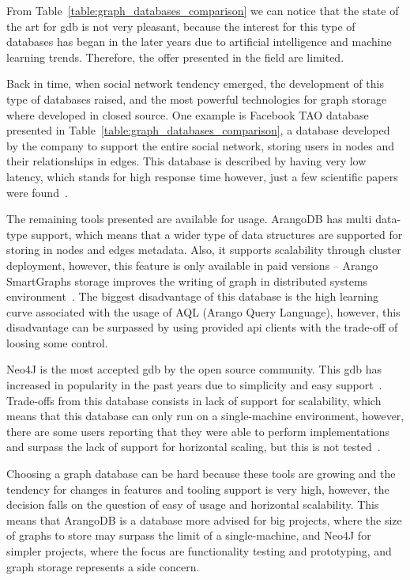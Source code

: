 From Table~\ref{table:graph_databases_comparison} we can notice that the state of the art for \gls{gdb} is not very pleasant, because the interest for this type of databases has began in the later years due to artificial intelligence and machine learning trends. Therefore, the offer presented in the field are limited.

Back in time, when social network tendency emerged, the development of this type of databases raised, and the most powerful technologies for graph storage where developed in closed source. One example is Facebook TAO database presented in Table~\ref{table:graph_databases_comparison}, a database developed by the company to support the entire social network, storing users in nodes and their relationships in edges. This database is described by having very low latency, which stands for high response time however, just a few scientific papers were found~\cite{facebook_tao_article,Amenya2018}.

The remaining tools presented are available for usage. ArangoDB has multi data-type support, which means that a wider type of data structures are supported for storing in nodes and edges metadata. Also, it supports scalability through cluster deployment, however, this feature is only available in paid versions -- Arango SmartGraphs storage improves the writing of graph in distributed systems environment~\cite{arangodb_smart_graphs}. The biggest disadvantage of this database is the high learning curve associated with the usage of AQL (Arango Query Language), however, this disadvantage can be surpassed by using provided \gls{api} clients with the trade-off of loosing some control.

Neo4J is the most accepted \gls{gdb} by the open source community. This \gls{gdb}
has increased in popularity in the past years due to simplicity and easy support~\cite{Turu2017}. Trade-offs from this database consists in lack of support for scalability, which means that this database can only run on a single-machine environment, however, there are some users reporting that they were able to perform implementations and surpass the lack of support for horizontal scaling, but this is not tested~\cite{neo4j_scalable}.

Choosing a graph database can be hard because these tools are growing and the tendency for changes in features and tooling support is very high, however,  the decision falls on the question of easy of usage and horizontal scalability. This means that ArangoDB is a database more advised for big projects, where the size of graphs to store may surpass the limit of a single-machine, and Neo4J for simpler projects, where the focus are functionality testing and prototyping, and graph storage represents a side concern.

